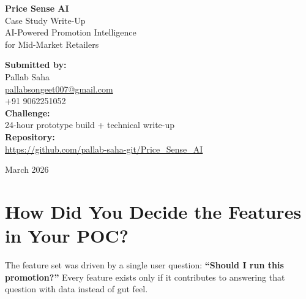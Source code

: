 \documentclass[11pt, a4paper]{article}
\begin{document}
\begin{titlepage}
    \centering
    \vspace*{3cm}
    
    {\Huge\bfseries\textcolor{darktext}{Price Sense AI}}\\[1cm]
    {\LARGE\textcolor{brand}{Case Study Write-Up}}\\[2cm]
    {\Large AI-Powered Promotion Intelligence\\[0.3cm] for Mid-Market Retailers}\\[3cm]
    
    \begin{flushleft}
    \large
    \textbf{Submitted by:}\\[0.5cm]
    Pallab Saha\\[0.3cm]
    \href{mailto:pallabsongeet007@gmail.com}{pallabsongeet007@gmail.com}\\[0.3cm]
    +91 9062251052\\[1cm]
    
    \textbf{Challenge:}\\[0.3cm]
    24-hour prototype build + technical write-up\\[1cm]
    
    \textbf{Repository:}\\[0.3cm]
    \url{https://github.com/pallab-saha-git/Price_Sense_AI}
    \end{flushleft}
    
    \vfill
    {\large March 2026}
\end{titlepage}

\newpage

\section{How Did You Decide the Features in Your POC?}

The feature set was driven by a single user question: \textbf{``Should I run this promotion?''} Every feature exists only if it contributes to answering that question with data instead of gut feel.
\end{document}
